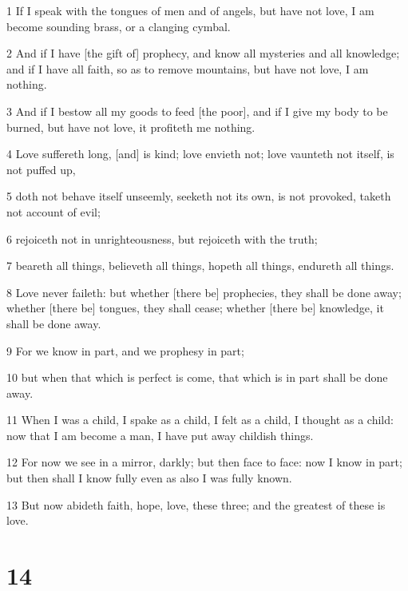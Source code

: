 \par 1 If I speak with the tongues of men and of angels, but have not love, I am become sounding brass, or a clanging cymbal.
\par 2 And if I have [the gift of] prophecy, and know all mysteries and all knowledge; and if I have all faith, so as to remove mountains, but have not love, I am nothing.
\par 3 And if I bestow all my goods to feed [the poor], and if I give my body to be burned, but have not love, it profiteth me nothing.
\par 4 Love suffereth long, [and] is kind; love envieth not; love vaunteth not itself, is not puffed up,
\par 5 doth not behave itself unseemly, seeketh not its own, is not provoked, taketh not account of evil;
\par 6 rejoiceth not in unrighteousness, but rejoiceth with the truth;
\par 7 beareth all things, believeth all things, hopeth all things, endureth all things.
\par 8 Love never faileth: but whether [there be] prophecies, they shall be done away; whether [there be] tongues, they shall cease; whether [there be] knowledge, it shall be done away.
\par 9 For we know in part, and we prophesy in part;
\par 10 but when that which is perfect is come, that which is in part shall be done away.
\par 11 When I was a child, I spake as a child, I felt as a child, I thought as a child: now that I am become a man, I have put away childish things.
\par 12 For now we see in a mirror, darkly; but then face to face: now I know in part; but then shall I know fully even as also I was fully known.
\par 13 But now abideth faith, hope, love, these three; and the greatest of these is love.

\chapter{14}

